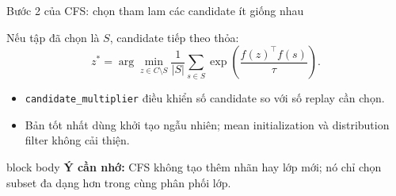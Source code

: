 \documentclass[aspectratio=169,11pt]{beamer}
\newcommand{\remember}[1]{%
  \vfill
  \begin{beamercolorbox}[wd=\textwidth,sep=0.22cm,rounded=true]{block body}
    \textbf{Ý cần nhớ:} #1
  \end{beamercolorbox}
}
\begin{document}
\begin{frame}{Bước 2 của CFS: chọn tham lam các candidate ít giống nhau}
  \centering

  \vspace{0.55cm}
  Nếu tập đã chọn là $S$, candidate tiếp theo thỏa:
  \[
    z^*=\arg\min_{z\in C\setminus S}
    \frac{1}{|S|}\sum_{s\in S}
    \exp\left(\frac{f(z)^\top f(s)}{\tau}\right).
  \]
  \begin{itemize}\setlength\itemsep{0.2cm}
    \item \texttt{candidate\_multiplier} điều khiển số candidate so với số replay cần chọn.
    \item Bản tốt nhất dùng khởi tạo ngẫu nhiên; mean initialization và distribution filter không cải thiện.
  \end{itemize}
  \remember{CFS không tạo thêm nhãn hay lớp mới; nó chỉ chọn subset đa dạng hơn trong cùng phân phối lớp.}
\end{frame}
\end{document}
